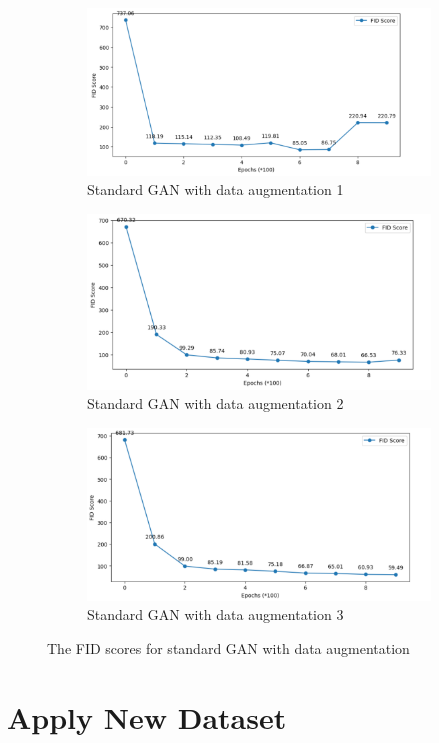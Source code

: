 \begin{figure}[H]
    \centering
    \begin{subfigure}[b]{\linewidth}
        \centering
        \includegraphics[width=0.84\linewidth]{./Images/standard_GAN_with_data_augementation1.jpg}
        \caption{Standard GAN with data augmentation 1}
        \label{fig:Dense}
    \end{subfigure}
    \vspace{0.05\linewidth} 
    \begin{subfigure}[b]{\linewidth}
        \centering
        \includegraphics[width=0.8\linewidth]{./Images/standard_GAN_with_data_augementation2.jpg}
        \caption{Standard GAN with data augmentation 2}
        \label{fig:Conv2DTranspose}
    \end{subfigure}
    \begin{subfigure}[b]{\linewidth}
        \centering
        \includegraphics[width=0.8\linewidth]{./Images/standard_GAN_with_data_augementation3.jpg}
        \caption{Standard GAN with data augmentation 3}
        \label{fig:Conv2DTranspose}
    \end{subfigure}
    \caption{The FID scores for standard GAN with data augmentation}
    \label{fig:combined}
\end{figure}



\section*{Apply New Dataset}


